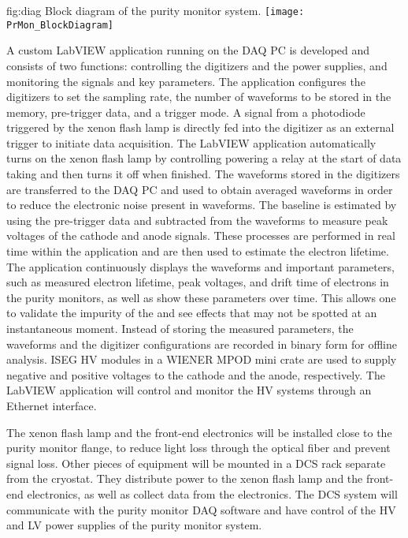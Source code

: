 \begin{dunefigure}{fig:diag}
  {Block diagram of the purity monitor system.}
  \texttt{[image: PrMon\_BlockDiagram]}%
\end{dunefigure}

A custom LabVIEW application running on the DAQ PC is developed and consists of two functions: controlling the digitizers and the power supplies, and monitoring the signals and key parameters. The application configures the digitizers to set the sampling rate, the number of waveforms to be stored in the memory, pre-trigger data, and a trigger mode. A signal from a photodiode triggered by the xenon flash lamp is directly fed into the digitizer as an external trigger to initiate data acquisition. The LabVIEW application automatically turns on the xenon flash lamp by controlling powering a relay at the start of data taking and then turns it off when finished. The waveforms stored in the digitizers are transferred to the DAQ PC and used to obtain averaged waveforms in order to reduce the electronic noise present in waveforms. The baseline is estimated by using the pre-trigger data and subtracted from the waveforms to measure peak voltages of the cathode and anode signals. These processes are performed in real time within the application and are then used to estimate the electron lifetime. The application continuously displays the waveforms and important parameters, such as measured electron lifetime, peak voltages, and drift time of electrons in the purity monitors, as well as show these parameters over time. This allows one to validate the impurity of the  and see effects that may not be spotted at an instantaneous moment. Instead of storing the measured parameters, the waveforms and the digitizer configurations are recorded in binary form for offline analysis. ISEG HV modules in a WIENER MPOD mini crate are used to supply negative and positive voltages to the cathode and the anode, respectively. The LabVIEW application will control and monitor the HV systems through an Ethernet interface.  

The xenon flash lamp and the front-end electronics will be installed close to the purity monitor flange, to reduce light loss through the optical fiber and prevent signal loss. Other pieces of equipment will be mounted in a DCS rack separate from the cryostat. They distribute power to the xenon flash lamp and the front-end electronics, as well as collect data from the electronics. The DCS system will communicate with the purity monitor DAQ software and have control of the HV and LV power supplies of the purity monitor system. 

